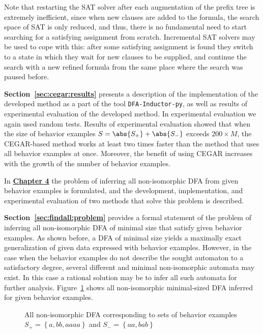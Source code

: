 Note that restarting the SAT solver after each augmentation of the prefix tree is extremely inefficient, since when new clauses are added to the formula, 
the search space of SAT is only reduced, and thus, there is no fundamental need to start searching for a satisfying assignment from scratch.
Incremental SAT solvers may be used to cope with this: after some satisfying assignment is found they switch to a state in which they wait for new clauses to be supplied,
and continue the search with a new refined formula from the same place where the search was paused before.


\textbf{Section~\ref{sec:cegar:results}} presents a description of the implementation of the developed method as a part of the tool \texttt{DFA-Inductor-py}, 
as well as results of experimental evaluation of the developed method.
In experimental evaluation we again used random tests.
Results of experimental evaluation showed that when the size of behavior examples $S=\abs{S_{+}}+\abs{S_{-}}$ exceeds $200 \times M$,
the CEGAR-based method works at least two times faster than the method that uses all behavior examples at once.
Moreover, the benefit of using CEGAR increases with the growth of the number of behavior examples.


In \textbf{\underline{Chapter 4}} the problem of inferring all non-isomorphic DFA from given behavior examples is formulated, and the development, implementation, and
experimental evaluation of two methods that solve this problem is described.

\textbf{Section~\ref{sec:findall:problem}} provides a formal statement of the problem of inferring all non-isomorphic DFA of minimal size that satisfy given behavior examples.
As shown before, a DFA of minimal size yields a maximally exact generalization of given data expressed with behavior examples.
However, in the case when the behavior examples do not describe the sought automaton to a satisfactory degree, several different and minimal non-isomorphic automata may exist.
In this case a rational solution may be to infer all such automata for further analysis.
Figure~\ref{syn-en:img:find-all} shows all non-isomorphic minimal-sized DFA inferred for given behavior examples.
%
\begin{figure}[ht]
  \centering
  \ifafour
    
  \else
    
  \fi
  \caption{All non-isomorphic DFA corresponding to sets of behavior examples $S_{+} = \left\{a, bb, aaaa\right\}$ and $S_{-}=\left\{aa, bab\right\}$}
  \label{syn-en:img:find-all}
\end{figure}

